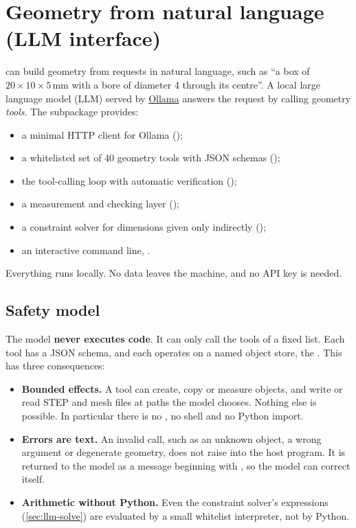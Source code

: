 \chapter{Geometry from natural language (LLM interface)}\label{ch:llm}

\NF{} can build geometry from requests in natural language, such as ``a box of
$20\times10\times5$\,mm with a bore of diameter 4 through its centre''. A local large language
model (LLM) served by \href{https://ollama.com}{Ollama} answers the request by calling geometry
\emph{tools}. The subpackage  provides:

\begin{itemize}
  \item a minimal HTTP client for Ollama ();
  \item a whitelisted set of 40 geometry tools with JSON schemas ();
  \item the tool-calling loop with automatic verification ();
  \item a measurement and checking layer ();
  \item a constraint solver for dimensions given only indirectly
    ();
  \item an interactive command line, .
\end{itemize}

Everything runs locally. No data leaves the machine, and no API key is needed.

\section{Safety model}\label{sec:llm-safety}

The model \textbf{never executes code}. It can only call the tools of a fixed list. Each tool
has a JSON schema, and each operates on a named object store, the . This
has three consequences:

\begin{itemize}
  \item \textbf{Bounded effects.} A tool can create, copy or measure objects, and write or read
    STEP and mesh files at paths the model chooses. Nothing else is possible. In particular
    there is no , no shell and no Python import.
  \item \textbf{Errors are text.} An invalid call, such as an unknown object, a wrong argument
    or degenerate geometry, does not raise into the host program. It is returned to the model
    as a message beginning with , so the model can correct itself.
  \item \textbf{Arithmetic without Python.} Even the constraint solver's expressions
    (\cref{sec:llm-solve}) are evaluated by a small whitelist interpreter, not by Python.
\end{itemize}

